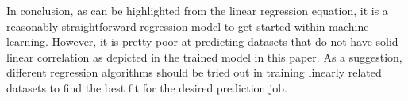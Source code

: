 \documentclass[conference]{IEEEtran}
\begin{document}
In conclusion, as can be highlighted from the linear regression equation, it is a reasonably straightforward regression model to get started within machine learning. However, it is pretty poor at predicting datasets that do not have solid linear correlation as depicted in the trained model in this paper. As a suggestion, different regression algorithms should be tried out in training linearly related datasets to find the best fit for the desired prediction job.



\end{document}
